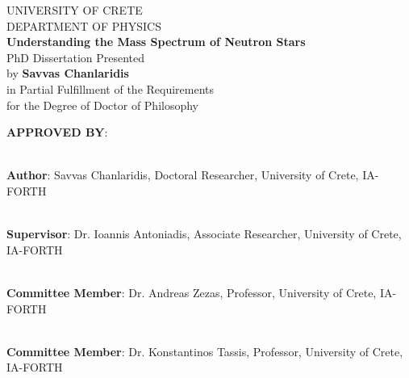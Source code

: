 \documentclass[main.tex]{subfiles}
\begin{document}
\newpage
    \thispagestyle{empty}
    \begin{center}
        UNIVERSITY OF CRETE \\
        \vspace{0.25cm}
        DEPARTMENT OF PHYSICS \\
        \vspace{0.5cm}
        \textbf{Understanding the Mass Spectrum of Neutron Stars} \\
        \vspace{0.5cm}
        PhD Dissertation Presented \\
        \vspace{0.5cm}
        by \textbf{Savvas Chanlaridis} \\
        \vspace{0.5cm}
        in Partial Fulfillment of the Requirements \\
        \vspace{0.5cm}
        for the Degree of Doctor of Philosophy
    \end{center}
     \vspace{0.8cm}
     
    \noindent \textbf{APPROVED BY}:\\
    \vspace*{1.0cm}
    
    \noindent\hrulefill \\
    \noindent\textbf{Author}: Savvas Chanlaridis, Doctoral Researcher, University of Crete, IA-FORTH \\
    \vspace*{0.5cm}
    
    \noindent\hrulefill \\
    \noindent\textbf{Supervisor}: Dr. Ioannis Antoniadis, Associate Researcher, University of Crete, IA-FORTH \\
    \vspace*{0.5cm}    
    
    \noindent\hrulefill \\
    \noindent\textbf{Committee Member}: Dr. Andreas Zezas, Professor, University of Crete, IA-FORTH \\
    \vspace*{0.5cm}    
    
    \noindent\hrulefill \\
    \noindent\textbf{Committee Member}: Dr. Konstantinos Tassis, Professor, University of Crete, IA-FORTH \\
    \vspace*{0.5cm}    
\end{document}
